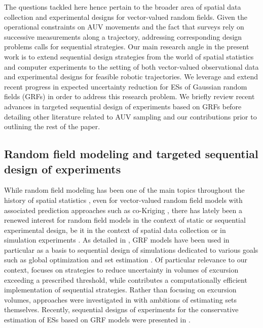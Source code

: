 \documentclass[aoas]{imsart}
\begin{document}
The questions tackled here hence pertain to the broader area of
spatial data collection and experimental designs for vector-valued
random fields.
Given the operational constraints on AUV movements and the fact that
surveys rely on successive measurements along a trajectory, addressing
corresponding design problems calls for sequential strategies.  Our
main research angle in the present work is to extend sequential design
strategies from the world of spatial statistics and computer
experiments to the setting of both vector-valued observational data
and experimental designs for feasible robotic trajectories. We
leverage and extend recent progress in expected uncertainty reduction
for ESs of Gaussian random fields (GRFs) in order to address this
research
problem. %
We briefly review recent advances in targeted sequential design of
experiments based on GRFs before detailing other literature related to
AUV sampling and our contributions prior to outlining the rest of the
paper.


\subsection{Random field modeling and targeted sequential design of experiments}
  
While random field modeling has been one of the main topics throughout
the history of spatial statistics \citep{Krige1951a,Stein1999}, even
for vector-valued random field models with associated prediction
approaches such as co-Kriging \citep[See, e.g.,][]{Wackernagel2003},
there has lately been a renewed interest for random field models in
the context of static or sequential experimental design, be it in the
context of spatial data collection \citep{Mueller2007} or in
simulation experiments \citep{Santner.etal2003}. As detailed in
\cite{Ginsbourger2018}, GRF models have been used in particular as a
basis to sequential design of simulations dedicated to various goals
such as global optimization and set estimation
\citep{Adler.Taylor2007}. Of particular relevance to our context,
\cite{Bect.etal2012} focuses on strategies to reduce uncertainty in
volumes of excursion exceeding a prescribed threshold, while
\cite{chevalier2014fast} contributes a computationally efficient
implementation of sequential strategies. Rather than focusing on
excursion volumes, approaches were investigated in
\cite{French.Sain2013,Chevalier.etal2013b,Bolin.Lindgren2015,Azzimonti.etal2016}
with ambitions of estimating sets themselves. Recently, sequential
designs of experiments for the conservative estimation of ESs based on
GRF models were presented in \citep{Azzimonti.etal}.
\end{document}
